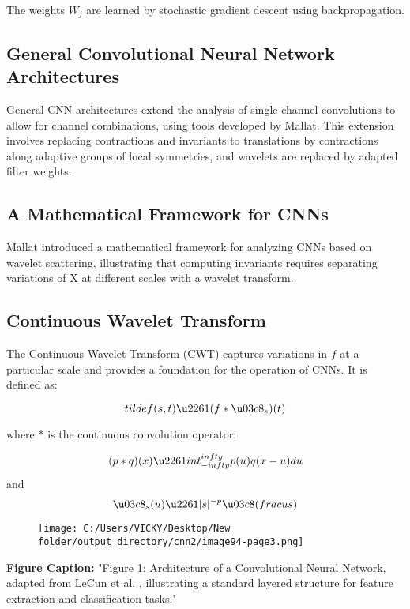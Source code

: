 \documentclass{article}
\begin{document}
The weights $W_j$ are learned by stochastic gradient descent using backpropagation.

\subsection*{General Convolutional Neural Network Architectures}
General CNN architectures extend the analysis of single-channel convolutions to allow for channel combinations, using tools developed by Mallat. This extension involves replacing contractions and invariants to translations by contractions along adaptive groups of local symmetries, and wavelets are replaced by adapted filter weights.

\subsection*{A Mathematical Framework for CNNs}
Mallat introduced a mathematical framework for analyzing CNNs based on wavelet scattering, illustrating that computing invariants requires separating variations of X at different scales with a wavelet transform.

\subsection*{Continuous Wavelet Transform}
The Continuous Wavelet Transform (CWT) captures variations in $f$ at a particular scale and provides a foundation for the operation of CNNs. It is defined as:

$$\\tilde{f}(s, t) \u2261 (f * \u03c8_s)(t)$$

where $*$ is the continuous convolution operator:

$$(p * q)(x) \u2261 \\int_{-\\infty}^{\\infty} p(u)q(x - u)du$$
and
$$\u03c8_s(u) \u2261 |s|^{-p}\u03c8(\\frac{u}{s})$$


\begin{figure}[h]
\centering
\texttt{[image: C:/Users/VICKY/Desktop/New folder/output\_directory/cnn2/image94-page3.png]}
\end{figure}


\textbf{Figure Caption:} "Figure 1: Architecture of a Convolutional Neural Network, adapted from LeCun et al. \cite{7}, illustrating a standard layered structure for feature extraction and classification tasks."
\end{document}
